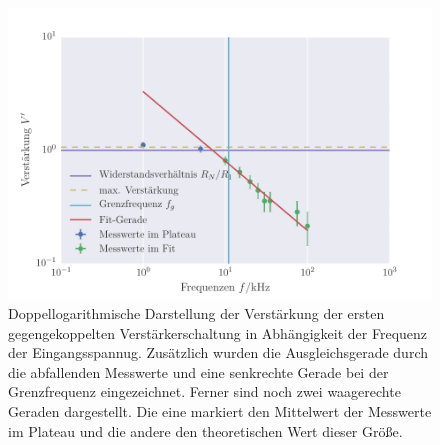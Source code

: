 \FloatBarrier
\begin{figure}[!h]
\centering
\includegraphics[scale=1]{../Grafiken/Gegengekoppelter_Verstaerker_1.pdf}
\caption{Doppellogarithmische Darstellung der Verstärkung der ersten gegengekoppelten Verstärkerschaltung in Abhängigkeit der Frequenz der Eingangsspannug. Zusätzlich wurden die Ausgleichsgerade
	durch die abfallenden Messwerte und eine senkrechte Gerade bei der Grenzfrequenz eingezeichnet. Ferner sind noch  zwei waagerechte Geraden dargestellt. Die eine markiert den Mittelwert der Messwerte im Plateau und die  andere
	den theoretischen Wert dieser Größe.
	\label{fig:gegengekoppelter_verstaerker_1}}
\end{figure}
\FloatBarrier